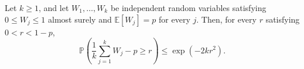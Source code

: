 Let \(k\geq1\), and let \(W_1,\ldots,W_k\) be independent random variables satisfying \(0\leq W_j\leq1\) almost surely and \(\mathbb E[W_j]=p\) for every \(j\).  Then, for every \(r\) satisfying \(0<r<1-p\),
\[
 \mathbb P\!\left(\frac1k\sum_{j=1}^kW_j-p\geq r\right)\leq\exp(-2kr^2).
\]
